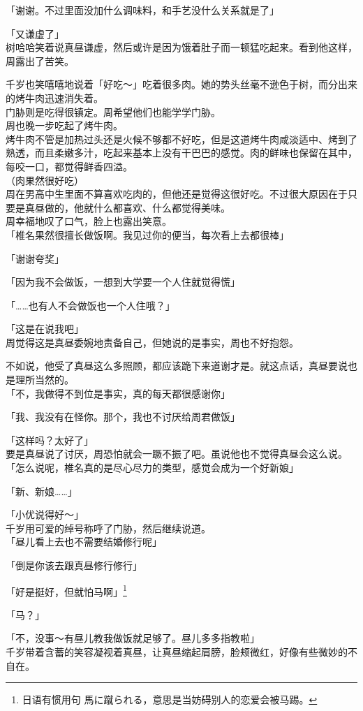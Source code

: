 「谢谢。不过里面没加什么调味料，和手艺没什么关系就是了」

「又谦虚了」\\

树哈哈笑着说真昼谦虚，然后或许是因为饿着肚子而一顿猛吃起来。看到他这样，周露出了苦笑。

千岁也笑嘻嘻地说着「好吃～」吃着很多肉。她的势头丝毫不逊色于树，而分出来的烤牛肉迅速消失着。\\

门胁则是吃得很镇定。周希望他们也能学学门胁。\\

周也晚一步吃起了烤牛肉。\\

烤牛肉不管是加热过头还是火候不够都不好吃，但是这道烤牛肉咸淡适中、烤到了熟透，而且柔嫩多汁，吃起来基本上没有干巴巴的感觉。肉的鲜味也保留在其中，每咬一口，都觉得鲜香四溢。\\

（肉果然很好吃）\\

周在男高中生里面不算喜欢吃肉的，但他还是觉得这很好吃。不过很大原因在于只要是真昼做的，他就什么都喜欢、什么都觉得美味。\\

周幸福地叹了口气，脸上也露出笑意。\\

「椎名果然很擅长做饭啊。我见过你的便当，每次看上去都很棒」

「谢谢夸奖」

「因为我不会做饭，一想到大学要一个人住就觉得慌」

「……也有人不会做饭也一个人住哦？」

「这是在说我吧」\\

周觉得这是真昼委婉地责备自己，但她说的是事实，周也不好抱怨。

不如说，他受了真昼这么多照顾，都应该跪下来道谢才是。就这点话，真昼要说也是理所当然的。\\

「不，我做得不到位是事实，真的每天都很感谢你」

「我、我没有在怪你。那个，我也不讨厌给周君做饭」

「这样吗？太好了」\\

要是真昼说了讨厌，周恐怕就会一蹶不振了吧。虽说他也不觉得真昼会这么说。\\

「怎么说呢，椎名真的是尽心尽力的类型，感觉会成为一个好新娘」

「新、新娘……」

「小优说得好～」\\

千岁用可爱的绰号称呼了门胁，然后继续说道。\\

「昼儿看上去也不需要结婚修行呢」

「倒是你该去跟真昼修行修行」

「好是挺好，但就怕马啊」\footnote{日语有惯用句 {\jpfont 馬に蹴られる}，意思是当妨碍别人的恋爱会被马踢。}

「马？」

「不，没事～有昼儿教我做饭就足够了。昼儿多多指教啦」\\

千岁带着含蓄的笑容凝视着真昼，让真昼缩起肩膀，脸颊微红，好像有些微妙的不自在。
